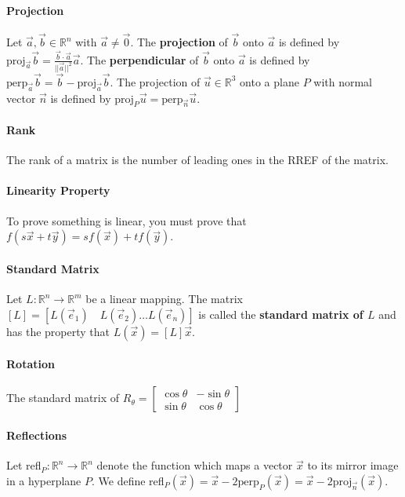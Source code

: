 \documentclass[10pt,letter]{article}
\begin{document}
\paragraph{Projection} Let $\vec{a},\vec{b}\in\mathbb{R}^n$ with $\vec{a}\neq\vec{0}$. The \textbf{projection} of $\vec{b}$ onto $\vec{a}$ is defined by $\text{proj}_{\vec{a}}\vec{b}=\frac{\vec{b}\cdot\vec{a}}{||\vec{a}||^2}\vec{a}$. The \textbf{perpendicular} of $\vec{b}$ onto $\vec{a}$ is defined by $\text{perp}_{\vec{a}}\vec{b}=\vec{b}-\text{proj}_{\vec{a}}\vec{b}$. The projection of $\vec{u}\in\mathbb{R}^3$ onto a plane $P$ with normal vector $\vec{n}$ is defined by $\text{proj}_P\vec{u}=\text{perp}_{\vec{n}}\vec{u}$.

\paragraph{Rank} The rank of a matrix is the number of leading ones in the RREF of the matrix. 

\paragraph{Linearity Property} To prove something is linear, you must prove that $f(s\vec{x}+t\vec{y})=sf(\vec{x})+tf(\vec{y})$. 

\paragraph{Standard Matrix} Let $L:\mathbb{R}^n\rightarrow\mathbb{R}^m$ be a linear mapping. The matrix $[L] = [L(\vec{e}_1)\quad L(\vec{e}_2)\ldots L(\vec{e}_n)]$ is called the \textbf{standard matrix of $L$} and has the property that $L(\vec{x})=[L]\vec{x}$.

\paragraph{Rotation} The standard matrix of $R_{\theta}=\begin{bmatrix}\cos\theta&-\sin\theta\\\sin\theta&\cos\theta\end{bmatrix}$

\paragraph{Reflections} Let refl$_P:\mathbb{R}^n\rightarrow\mathbb{R}^n$ denote the function which maps a vector $\vec{x}$ to its mirror image in a hyperplane $P$. We define refl$_P(\vec{x})=\vec{x}-2\text{perp}_P(\vec{x})=\vec{x}-2\text{proj}_{\vec{n}}(\vec{x})$.
\end{document}
